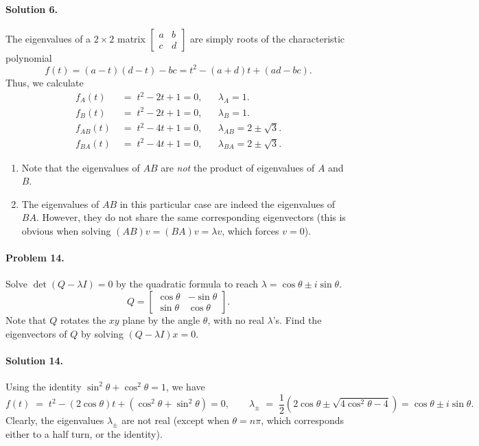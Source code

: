\documentclass[10pt]{article}
\begin{document}
        \paragraph{Solution 6.}
        The eigenvalues of a $2\times 2$ matrix $\begin{bmatrix}
                a & b \\ c & d
        \end{bmatrix}$ are simply roots of the characteristic polynomial \[f(t) = (a - t)(d - t) - bc = t^2 - (a + d)t + (ad - bc).\]
        Thus, we calculate
        \begin{align*}
                f_A(t) \;&=\; t^2 - 2t + 1 = 0, && \lambda_A = 1. \\
                f_B(t) \;&=\; t^2 - 2t + 1 = 0, && \lambda_B = 1. \\
                f_{AB}(t) \;&=\; t^2 - 4t + 1 = 0, && \lambda_{AB} = 2 \pm \sqrt{3}. \\
                f_{BA}(t) \;&=\; t^2 - 4t + 1 = 0, && \lambda_{BA} = 2 \pm \sqrt{3}.
        \end{align*}
        \begin{enumerate}
                \item Note that the eigenvalues of $AB$ are \textit{not} the product of eigenvalues of $A$ and $B$.
                \item The eigenvalues of $AB$ in this particular case are indeed the eigenvalues of $BA$. However,
                they do not share the same corresponding eigenvectors (this is obvious when solving $(AB)v = (BA)v = \lambda v$, which forces $v = 0$).
        \end{enumerate}



        \paragraph{Problem 14.}
        Solve $\det(Q - \lambda I) = 0$ by the quadratic formula to reach $\lambda = \cos\theta \pm i\sin\theta$.
        \[
        Q = \begin{bmatrix}
                \cos\theta & -\sin\theta \\ \sin\theta & \cos\theta
        \end{bmatrix}.
        \]
        Note that $Q$ rotates the $xy$ plane by the angle $\theta$, with no real $\lambda$'s.
        Find the eigenvectors of $Q$ by solving $(Q - \lambda I)x = 0$.
        \paragraph{Solution 14.}
        Using the identity $\sin^2\theta + \cos^2\theta = 1$, we have
        \[
        f(t) \;=\; t^2 - (2\cos\theta)t + (\cos^2\theta + \sin^2\theta) = 0, \quad\quad 
                \lambda_{\pm} \;=\; \frac{1}{2}(2\cos\theta \pm \sqrt{4\cos^2\theta - 4}) = \cos\theta \pm i\sin\theta.
        \]
        Clearly, the eigenvalues $\lambda_{\pm}$ are not real (except when $\theta = n\pi$, which corresponds either to a half turn, or the identity). \\
\end{document}
